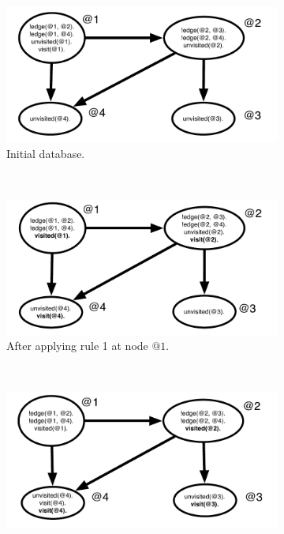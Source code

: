 \begin{figure}
        \centering
        \begin{subfigure}[b]{0.5\textwidth}
                \includegraphics[width=\textwidth]{execution_trace1}
                \caption{Initial database.}
                \label{fig:exec_trace1}
        \end{subfigure}%
        ~ %
        \begin{subfigure}[b]{0.5\textwidth}
                \includegraphics[width=\textwidth]{execution_trace2}
                \caption{After applying rule 1 at node $@1$.}
                \label{fig:exec_trace2}
        \end{subfigure}\\
        \begin{subfigure}[b]{0.5\textwidth}
                \includegraphics[width=\textwidth]{execution_trace3}

\end{subfigure}
\end{figure}

